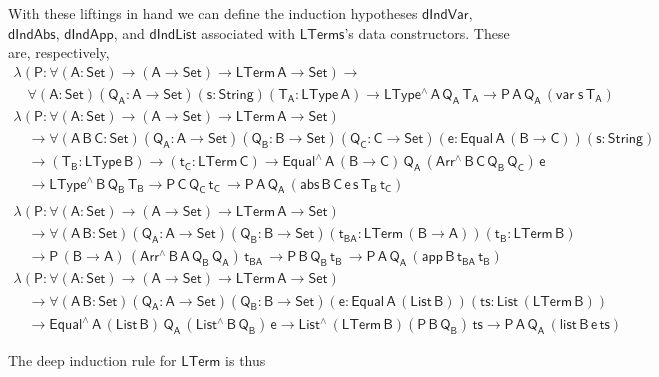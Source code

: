 \documentclass[9pt]{entcs}
\begin{document}
With these liftings in hand we can define the induction hypotheses
$\mathsf{dIndVar}$, $\mathsf{dIndAbs}$, $\mathsf{dIndApp}$, and
$\mathsf{dIndList}$ associated with $\mathsf{LTerms}$'s data
constructors. These are, respectively,
\[\begin{array}{l}
\mathsf{\lambda (P : \forall (A : Set) \to (A \to Set) \to
  LTerm\,A  \to Set) \to}\\
  \quad\mathsf{\forall (A : Set) (Q_A : A \to Set) (s : String) (T_A :
  LType\, A) \to LType^{\wedge} \, A\, Q_A\, T_A \to P \, A\, Q_A\,
  (var \; s\, T_A)}\\[1ex]
  \mathsf{\lambda (P : \forall (A : Set) \to (A \to Set) \to
  LTerm\,A \to Set)} \\ 
  \quad\mathsf{\to 
  \forall (A\,B\,C: Set) (Q_A : A \to Set)  (Q_B : B \to Set) (Q_C : C
  \to Set) (e : Equal\, A\, (B \to C)) (s : String) } \\ 
  \quad\mathsf{ \to (T_B : LType\, B) \to (t_C : LTerm\, C)
  \to Equal^{\wedge}\,A\,(B \to C)\, Q_A \, (Arr^{\wedge} \, B\, C\,
  Q_B \, Q_C) \, e } \\
  \quad\mathsf{
  \to LType^{\wedge}\, B\, Q_B\, T_B
  \to P\, C\, Q_C\, t_C\, 
  \to P \, A\, Q_A\, (abs \,B \,C \, e \,s \,T_B \, t_C)
  }\\[1ex]
\end{array}\]
\[\begin{array}{l}
  \mathsf{\lambda (P : \forall (A : Set) \to (A \to Set) \to LTerm\,A
    \to Set)} \\ 
  \quad \mathsf{\to 
  \forall (A \,B : Set) (Q_A : A \to Set)  (Q_B : B \to Set) 
   (t_{BA} : LTerm\, (B \to A)) (t_B : LTerm\, B)} \\
  \quad \mathsf{
  \to P\, (B \to A)\, (Arr^{\wedge} \, B\, A\, Q_B \, Q_A) \, t_{BA} \, 
  \to P\, B\, Q_B\, t_B\, 
  \to P \, A\, Q_A\, (app \,B \,t_{BA} \, t_B) }\\[1ex]
  \mathsf{\lambda (P : \forall (A : Set) \to (A \to Set) \to LTerm\,A
    \to Set)} \\ 
  \quad \mathsf{\to 
  \forall (A \,B : Set) (Q_A : A \to Set)  (Q_B : B \to Set) 
    (e : Equal\, A\, (List\, B)) (ts : List\, (LTerm\, B))} \\ 
  \quad \mathsf{
    \to Equal^{\wedge}\, A\, (List\,B)\, Q_A\, (List^{\wedge}\, B\, Q_B)\, e 
  \to List^{\wedge}\, (LTerm\,B) (P\, B\, Q_B)\, ts
  \to P \, A\, Q_A\, (list \,B \,e \, ts) }
\end{array}\]

\noindent
The deep induction rule for $\mathsf{LTerm}$ is thus
\end{document}
